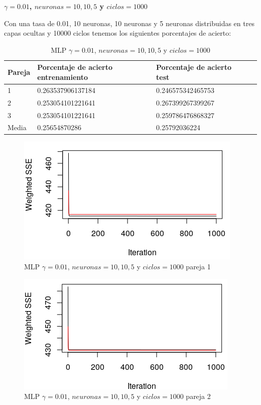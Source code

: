 \documentclass[11pt,spanish,listoffigures,listoftables]{workluis}
\begin{document}

\par \textbf{$\gamma = 0.01$, $neuronas = 10,10,5$ y $ciclos = 1000$}

\par Con una tasa de 0.01, 10 neuronas, 10 neuronas y 5 neuronas distribuidas en tres capas ocultas y 10000 ciclos tenemos los siguientes porcentajes de acierto:

\begin{table}[H]
\centering
\caption{MLP $\gamma = 0.01$, $neuronas = 10,10,5$ y $ciclos = 1000$}
\label{tb:tb3}
\begin{tabular}{lllll}
\hline
\multicolumn{1}{|l|}{Pareja} & Porcentaje de acierto entrenamiento & Porcentaje de acierto test  \\ \hline \hline
1                            & 0.263537906137184    & 0.246575342465753 \\
2                            & 0.253054101221641    & 0.267399267399267 \\
3                            & 0.253054101221641    & 0.259786476868327 \\
Media                        & 0.25654870286        & 0.25792036224     \\ \hline
\end{tabular}
\end{table}

\begin{figure}[H]
\centering
\includegraphics[scale=0.5]{001101051}
\caption{MLP $\gamma = 0.01$, $neuronas = 10,10,5$ y $ciclos = 1000$ pareja 1}
\end{figure} 

\begin{figure}[H]
\centering
\includegraphics[scale=0.5]{001101052}
\caption{MLP $\gamma = 0.01$, $neuronas = 10,10,5$ y $ciclos = 1000$ pareja 2}
\end{figure} 
\end{document}
